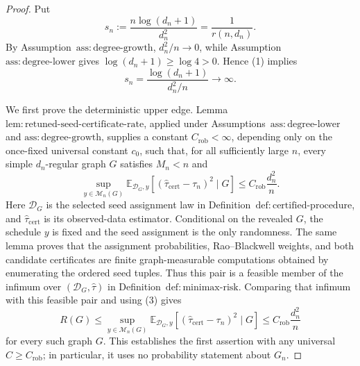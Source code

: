 \documentclass{article}
\begin{document}
\begin{proof}
Put
\[
s_n:=\frac{n\log(d_n+1)}{d_n^2}=\frac{1}{r(n,d_n)}.
\tag{1}
\]
By Assumption~\(\mathrm{ass{:}degree\mbox{-}growth}\), \(d_n^2/n\to0\), while Assumption~\(\mathrm{ass{:}degree\mbox{-}lower}\) gives \(\log(d_n+1)\ge\log4>0\).  Hence (1) implies
\[
s_n=\frac{\log(d_n+1)}{d_n^2/n}\longrightarrow\infty.
\tag{2}
\]

We first prove the deterministic upper edge.  Lemma~\(\mathrm{lem{:}retuned\mbox{-}seed\mbox{-}certificate\mbox{-}rate}\), applied under Assumptions~\(\mathrm{ass{:}degree\mbox{-}lower}\) and \(\mathrm{ass{:}degree\mbox{-}growth}\), supplies a constant \(C_{\mathrm{rob}}<\infty\), depending only on the once-fixed universal constant \(c_0\), such that, for all sufficiently large \(n\), every simple \(d_n\)-regular graph \(G\) satisfies \(M_n<n\) and
\[
\sup_{y\in\mathcal M_n(G)}
\mathbb E_{\mathcal D_G,y}\!\left[
  (\widehat\tau_{\mathrm{cert}}-\tau_n)^2\mid G
\right]
\le C_{\mathrm{rob}}\frac{d_n^2}{n}.
\tag{3}
\]
Here \(\mathcal D_G\) is the selected seed assignment law in Definition~\(\mathrm{def{:}certified\mbox{-}procedure}\), and \(\widehat\tau_{\mathrm{cert}}\) is its observed-data estimator.  Conditional on the revealed \(G\), the schedule \(y\) is fixed and the seed assignment is the only randomness.  The same lemma proves that the assignment probabilities, Rao--Blackwell weights, and both candidate certificates are finite graph-measurable computations obtained by enumerating the ordered seed tuples.  Thus this pair is a feasible member of the infimum over \((\mathcal D_G,\widehat\tau)\) in Definition~\(\mathrm{def{:}minimax\mbox{-}risk}\).  Comparing that infimum with this feasible pair and using (3) gives
\[
R(G)
\le
\sup_{y\in\mathcal M_n(G)}
\mathbb E_{\mathcal D_G,y}\!\left[
  (\widehat\tau_{\mathrm{cert}}-\tau_n)^2\mid G
\right]
\le C_{\mathrm{rob}}\frac{d_n^2}{n}
\tag{4}
\]
for every such graph \(G\).  This establishes the first assertion with any universal \(C\ge C_{\mathrm{rob}}\); in particular, it uses no probability statement about \(G_n\).


\end{proof}
\end{document}
